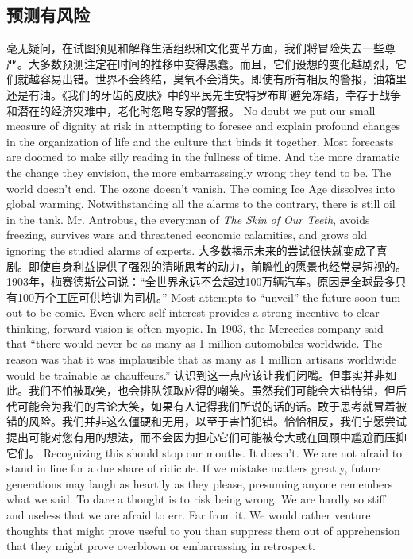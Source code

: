 \subsection{预测有风险}
\begin{paracol}{2}
毫无疑问，在试图预见和解释生活组织和文化变革方面，我们将冒险失去一些尊严。大多数预测注定在时间的推移中变得愚蠢。而且，它们设想的变化越剧烈，它们就越容易出错。世界不会终结，臭氧不会消失。即使有所有相反的警报，油箱里还是有油。《我们的牙齿的皮肤》中的平民先生安特罗布斯避免冻结，幸存于战争和潜在的经济灾难中，老化时忽略专家的警报。
\switchcolumn
No doubt we put our small measure of dignity at risk in attempting to foresee and explain profound changes in the organization of life and the culture that binds it together. Most forecasts are doomed to make silly reading in the fullness of time. And the more dramatic the change they envision, the more embarrassingly wrong they tend to be. The world doesn't end. The ozone doesn't vanish. The coming Ice Age dissolves into global warming. Notwithstanding all the alarms to the contrary, there is still oil in the tank. Mr. Antrobus, the everyman of \emph{The Skin of Our Teeth}, avoids freezing, survives wars and threatened economic calamities, and grows old ignoring the studied alarms of experts.
\switchcolumn*
大多数揭示未来的尝试很快就变成了喜剧。即使自身利益提供了强烈的清晰思考的动力，前瞻性的愿景也经常是短视的。1903年，梅赛德斯公司说：“全世界永远不会超过100万辆汽车。原因是全球最多只有100万个工匠可供培训为司机。”
\switchcolumn
Most attempts to ``unveil'' the future soon tum out to be comic. Even where self-interest provides a strong incentive to clear thinking, forward vision is often myopic. In 1903, the Mercedes company said that ``there would never be as many as 1 million automobiles worldwide. The reason was that it was implausible that as many as 1 million artisans worldwide would be trainable as chauffeurs.''
\switchcolumn*
认识到这一点应该让我们闭嘴。但事实并非如此。我们不怕被取笑，也会排队领取应得的嘲笑。虽然我们可能会大错特错，但后代可能会为我们的言论大笑，如果有人记得我们所说的话的话。敢于思考就冒着被错的风险。我们并非这么僵硬和无用，以至于害怕犯错。恰恰相反，我们宁愿尝试提出可能对您有用的想法，而不会因为担心它们可能被夸大或在回顾中尴尬而压抑它们。
\switchcolumn
Recognizing this should stop our mouths. It doesn't. We are not afraid to stand in line for a due share of ridicule. If we mistake matters greatly, future generations may laugh as heartily as they please, presuming anyone remembers what we said. To dare a thought is to risk being wrong. We are hardly so stiff and useless that we are afraid to err. Far from it. We would rather venture thoughts that might prove useful to you than suppress them out of apprehension that they might prove overblown or embarrassing in retrospect.

\end{paracol}
